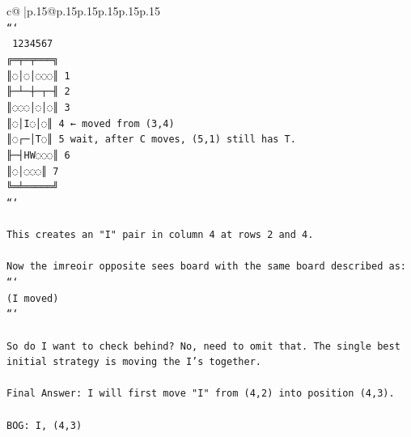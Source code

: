 \documentclass{article}
\begin{document}
{\begin{supertabular}{c@{$\;$}|p{.15\linewidth}@{}p{.15\linewidth}p{.15\linewidth}p{.15\linewidth}p{.15\linewidth}p{.15\linewidth}}
{{{\\ 
\texttt{```} \\
\texttt{ 1234567} \\
\texttt{╔═╤═╤═══╗} \\
\texttt{║◌│◌│◌◌◌║ 1} \\
\texttt{╟─┴─┼─┬─╢ 2} \\
\texttt{║◌◌◌│◌│◌║ 3} \\
\texttt{║◌│I◌│◌║ 4      ← moved from (3,4)} \\
\texttt{║◌┌─│T◌║ 5        wait, after C moves, (5,1) still has T.} \\
\texttt{╟─┤HW◌◌◌║ 6} \\
\texttt{║◌│◌◌◌║ 7} \\
\texttt{╚═╧═════╝} \\
\texttt{```} \\
\\ 
\texttt{This creates an "I" pair in column 4 at rows 2 and 4.} \\
\\ 
\texttt{Now the imreoir opposite sees board with the same board described as:} \\
\texttt{```} \\
\texttt{(I moved)} \\
\texttt{```} \\
\\ 
\texttt{So do I want to check behind? No, need to omit that. The single best initial strategy is moving the I's together.} \\
\\ 
\texttt{Final Answer: I will first move "I" from (4,2) into position (4,3).} \\
\\ 
\texttt{BOG: I, (4,3)} \\
            }
        }
    }
     \\ \\


\end{supertabular}}
\end{document}
